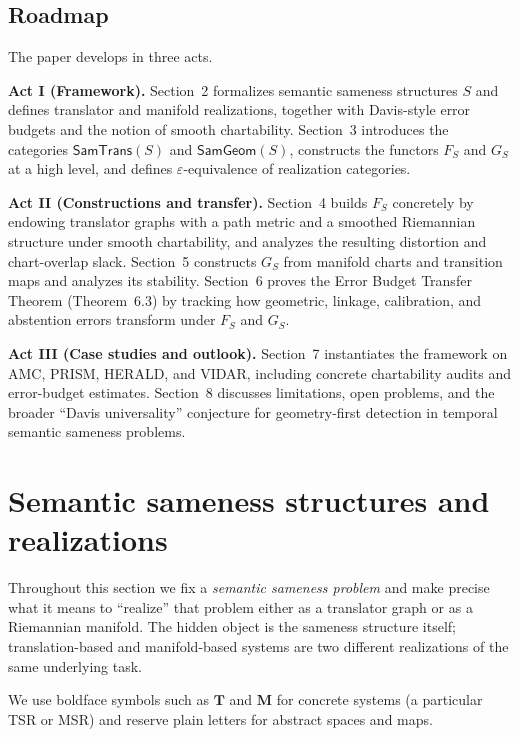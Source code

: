 \documentclass[11pt]{article}
\newcommand{\SamTrans}{\mathsf{SamTrans}}
\newcommand{\SamGeom}{\mathsf{SamGeom}}
\begin{document}
\subsection{Roadmap}

The paper develops in three acts.

\textbf{Act I (Framework).}  Section~2 formalizes semantic sameness structures $S$ and defines
translator and manifold realizations, together with Davis-style error budgets and the notion of
smooth chartability.  Section~3 introduces the categories $\SamTrans(S)$ and $\SamGeom(S)$,
constructs the functors $F_S$ and $G_S$ at a high level, and defines $\varepsilon$-equivalence of\label{def:eps-equivalence}
realization categories.

\textbf{Act II (Constructions and transfer).}  Section~4 builds $F_S$ concretely by endowing
translator graphs with a path metric and a smoothed Riemannian structure under smooth chartability,
and analyzes the resulting distortion and chart-overlap slack.  Section~5 constructs $G_S$ from
manifold charts and transition maps and analyzes its stability.  Section~6 proves the Error Budget
Transfer Theorem (Theorem~6.3) by tracking how geometric, linkage, calibration, and abstention
errors transform under $F_S$ and $G_S$.

\textbf{Act III (Case studies and outlook).}  Section~7 instantiates the framework on AMC, PRISM,
HERALD, and VIDAR, including concrete chartability audits and error-budget estimates.  Section~8
discusses limitations, open problems, and the broader “Davis universality” conjecture for
geometry-first detection in temporal semantic sameness problems.

\section{Semantic sameness structures and realizations}
\label{sec:sameness-structure}

Throughout this section we fix a \emph{semantic sameness problem} and make precise what it
means to ``realize'' that problem either as a translator graph or as a Riemannian manifold.
The hidden object is the sameness structure itself; translation-based and manifold-based
systems are two different realizations of the same underlying task.

We use boldface symbols such as $\mathbf{T}$ and $\mathbf{M}$ for concrete systems
(a particular TSR or MSR) and reserve plain letters for abstract spaces and maps.
\end{document}
